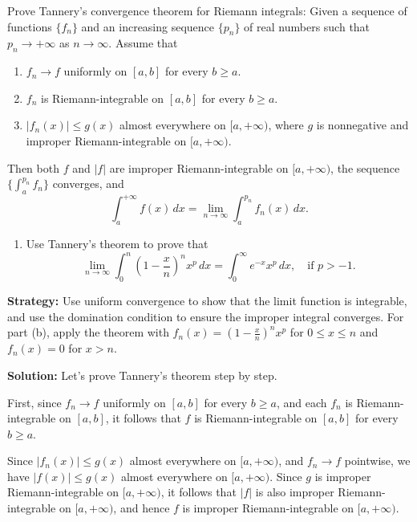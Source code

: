 \begin{problembox}
\begin{problemstatement}
Prove Tannery's convergence theorem for Riemann integrals: Given a sequence of functions $\{f_n\}$ and an increasing sequence $\{p_n\}$ of real numbers such that $p_n \to +\infty$ as $n \to \infty$. Assume that
\begin{enumerate}[label=(\alph*)]
\item $f_n \to f$ uniformly on $[a,b]$ for every $b \geq a$.
\item $f_n$ is Riemann-integrable on $[a,b]$ for every $b \geq a$.
\item $|f_n(x)| \leq g(x)$ almost everywhere on $[a,+\infty)$, where $g$ is nonnegative and improper Riemann-integrable on $[a,+\infty)$.
\end{enumerate}
Then both $f$ and $|f|$ are improper Riemann-integrable on $[a,+\infty)$, the sequence $\{\int_a^{p_n} f_n\}$ converges, and
\[\int_{a}^{+\infty} f(x) \, dx = \lim_{n \to \infty} \int_{a}^{p_n} f_n(x) \, dx.\]

\begin{enumerate}[label=(\alph*),resume]
\item Use Tannery's theorem to prove that
\[\lim_{n \to \infty} \int_{0}^{n} \left( 1 - \frac{x}{n} \right)^n x^p \, dx = \int_{0}^{\infty} e^{-x}x^p \, dx, \quad \text{if } p > -1.\]
\end{enumerate}
\end{problemstatement}
\end{problembox}

\noindent\textbf{Strategy:} Use uniform convergence to show that the limit function is integrable, and use the domination condition to ensure the improper integral converges. For part (b), apply the theorem with $f_n(x) = (1 - \frac{x}{n})^n x^p$ for $0 \leq x \leq n$ and $f_n(x) = 0$ for $x > n$.

\bigskip\noindent\textbf{Solution:}
Let's prove Tannery's theorem step by step.

First, since $f_n \to f$ uniformly on $[a,b]$ for every $b \geq a$, and each $f_n$ is Riemann-integrable on $[a,b]$, it follows that $f$ is Riemann-integrable on $[a,b]$ for every $b \geq a$.

Since $|f_n(x)| \leq g(x)$ almost everywhere on $[a,+\infty)$, and $f_n \to f$ pointwise, we have $|f(x)| \leq g(x)$ almost everywhere on $[a,+\infty)$. Since $g$ is improper Riemann-integrable on $[a,+\infty)$, it follows that $|f|$ is also improper Riemann-integrable on $[a,+\infty)$, and hence $f$ is improper Riemann-integrable on $[a,+\infty)$.

